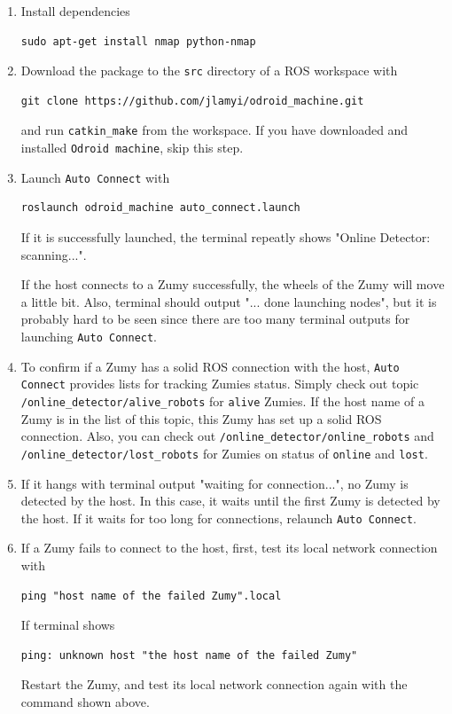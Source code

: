 \documentclass{article}
\begin{document}
\begin{enumerate}
\item Install dependencies
\begin{Verbatim}[frame=single]
sudo apt-get install nmap python-nmap
\end{Verbatim}

\item Download the package to the \verb=src= directory of a ROS workspace with
\begin{Verbatim}[frame=single]
git clone https://github.com/jlamyi/odroid_machine.git
\end{Verbatim}
and run \verb=catkin_make= from the workspace. If you have downloaded and installed \verb=Odroid machine=, skip this step.
 
\item Launch \verb=Auto Connect= with 
\begin{Verbatim}[frame=single]
roslaunch odroid_machine auto_connect.launch 
\end{Verbatim}

If it is successfully launched, the terminal repeatly shows "Online Detector: scanning...".

If the host connects to a Zumy successfully, the wheels of the Zumy will move a little bit. Also, terminal should output "... done launching nodes", but it is probably hard to be seen since there are too many terminal outputs for launching \verb=Auto Connect=.

\item To confirm if a Zumy has a solid ROS connection with the host, \verb=Auto Connect= provides lists for tracking Zumies status. Simply check out topic \verb=/online_detector/alive_robots= for \verb=alive= Zumies. If the host name of a Zumy is in the list of this topic, this Zumy has set up a solid ROS connection. Also, you can check out \verb=/online_detector/online_robots= and  \verb=/online_detector/lost_robots= for Zumies on status of \verb=online= and \verb=lost=.

\item If it hangs with terminal output "waiting for connection...", no Zumy is detected by the host. In this case, it waits until the first Zumy is detected by the host. If it waits for too long for connections, relaunch \verb=Auto Connect=.

\item If a Zumy fails to connect to the host, first, test its local network connection with
\begin{Verbatim}[frame=single]
ping "host name of the failed Zumy".local
\end{Verbatim} 

If terminal shows
\begin{Verbatim}[frame=single]
ping: unknown host "the host name of the failed Zumy"
\end{Verbatim} 
Restart the Zumy, and test its local network connection again with the command shown above.

\end{enumerate}
\end{document}
